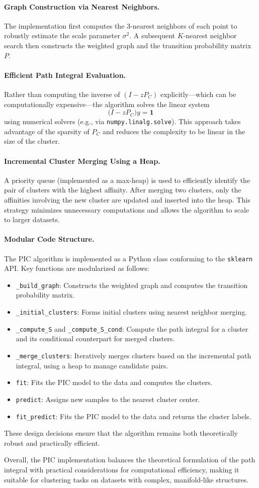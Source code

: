 \paragraph{Graph Construction via Nearest Neighbors.}  
The implementation first computes the 3-nearest neighbors of each point to robustly estimate the scale parameter $\sigma^2$. A subsequent $K$-nearest neighbor search then constructs the weighted graph and the transition probability matrix $P$.

\paragraph{Efficient Path Integral Evaluation.}  
Rather than computing the inverse of $(I - zP_C)$ explicitly—which can be computationally expensive—the algorithm solves the linear system
\[
\bigl(I - zP_C\bigr) y = \mathbf{1}
\]
using numerical solvers (e.g., via \texttt{numpy.linalg.solve}). This approach takes advantage of the sparsity of $P_C$ and reduces the complexity to be linear in the size of the cluster.

\paragraph{Incremental Cluster Merging Using a Heap.}  
A priority queue (implemented as a max-heap) is used to efficiently identify the pair of clusters with the highest affinity. After merging two clusters, only the affinities involving the new cluster are updated and inserted into the heap. This strategy minimizes unnecessary computations and allows the algorithm to scale to larger datasets.

\paragraph{Modular Code Structure.}  
The PIC algorithm is implemented as a Python class conforming to the \texttt{sklearn} API. Key functions are modularized as follows:
\begin{itemize}
  \item \texttt{\_build\_graph}: Constructs the weighted graph and computes the transition probability matrix.
  \item \texttt{\_initial\_clusters}: Forms initial clusters using nearest neighbor merging.
  \item \texttt{\_compute\_S} and \texttt{\_compute\_S\_cond}: Compute the path integral for a cluster and its conditional counterpart for merged clusters.
  \item \texttt{\_merge\_clusters}: Iteratively merges clusters based on the incremental path integral, using a heap to manage candidate pairs.
  \item \texttt{fit}: Fits the PIC model to the data and computes the clusters.
  \item \texttt{predict}: Assigns new samples to the nearest cluster center.
  \item \texttt{fit\_predict}: Fits the PIC model to the data and returns the cluster labels.
\end{itemize}
These design decisions ensure that the algorithm remains both theoretically robust and practically efficient.

Overall, the PIC implementation balances the theoretical formulation of the path integral with practical considerations for computational efficiency, making it suitable for clustering tasks on datasets with complex, manifold-like structures.
